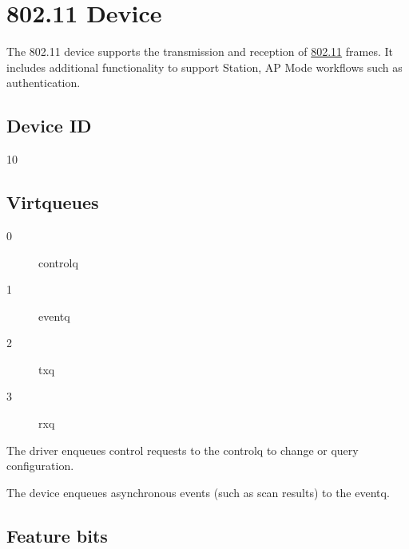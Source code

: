 \section{802.11 Device}\label{sec:Device Types / 802.11 Device}


The 802.11 device supports the transmission and reception of \hyperref[intro:IEEE 802.11]{802.11} frames.
It includes additional functionality to support Station, AP Mode workflows such as authentication.

\subsection{Device ID}\label{sec:Device Types / 802.11 Device / Device ID}

10

\subsection{Virtqueues}\label{sec:Device Types / 802.11 Device / Virtqueues}

\begin{description}
\item[0] controlq
\item[1] eventq
\item[2] txq
\item[3] rxq
\end{description}

The driver enqueues control requests to the controlq to change or query configuration.

The device enqueues asynchronous events (such as scan results) to the eventq.

\subsection{Feature bits}\label{sec:Device Types / 802.11 Device / Feature bits}

